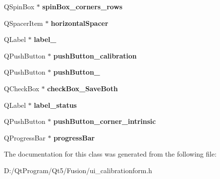 \begin{DoxyCompactItemize}
\item 
\hypertarget{class_ui__calibration_form_a5f1613c55ba70f5d798e6c5b08c89b45}{}Q\+Spin\+Box $\ast$ {\bfseries spin\+Box\+\_\+corners\+\_\+rows}\label{class_ui__calibration_form_a5f1613c55ba70f5d798e6c5b08c89b45}

\item 
\hypertarget{class_ui__calibration_form_a3f2fecb9aaf40cab405f381f3a8ec1de}{}Q\+Spacer\+Item $\ast$ {\bfseries horizontal\+Spacer}\label{class_ui__calibration_form_a3f2fecb9aaf40cab405f381f3a8ec1de}

\item 
\hypertarget{class_ui__calibration_form_a358c84164c30246387591d2c21246bb7}{}Q\+Label $\ast$ {\bfseries label\+\_}\label{class_ui__calibration_form_a358c84164c30246387591d2c21246bb7}

\item 
\hypertarget{class_ui__calibration_form_a78391f3438e253d7700092a530bcf30d}{}Q\+Push\+Button $\ast$ {\bfseries push\+Button\+\_\+calibration}\label{class_ui__calibration_form_a78391f3438e253d7700092a530bcf30d}

\item 
\hypertarget{class_ui__calibration_form_a4925459341f6593e26156ccc401421ad}{}Q\+Push\+Button $\ast$ {\bfseries push\+Button\+\_}\label{class_ui__calibration_form_a4925459341f6593e26156ccc401421ad}

\item 
\hypertarget{class_ui__calibration_form_a8b775bb32c33a7db877b842d302455de}{}Q\+Check\+Box $\ast$ {\bfseries check\+Box\+\_\+\+Save\+Both}\label{class_ui__calibration_form_a8b775bb32c33a7db877b842d302455de}

\item 
\hypertarget{class_ui__calibration_form_a69a40d8f1c5455676702edde2f374163}{}Q\+Label $\ast$ {\bfseries label\+\_\+status}\label{class_ui__calibration_form_a69a40d8f1c5455676702edde2f374163}

\item 
\hypertarget{class_ui__calibration_form_a3b0ea8f3c42bf5f5365aa10e54cbc295}{}Q\+Push\+Button $\ast$ {\bfseries push\+Button\+\_\+corner\+\_\+intrinsic}\label{class_ui__calibration_form_a3b0ea8f3c42bf5f5365aa10e54cbc295}

\item 
\hypertarget{class_ui__calibration_form_ac8f817c5b55ec50f17f9c48d6e8cf2f3}{}Q\+Progress\+Bar $\ast$ {\bfseries progress\+Bar}\label{class_ui__calibration_form_ac8f817c5b55ec50f17f9c48d6e8cf2f3}

\end{DoxyCompactItemize}


The documentation for this class was generated from the following file\+:\begin{DoxyCompactItemize}
\item 
D\+:/\+Qt\+Program/\+Qt5/\+Fusion/ui\+\_\+calibrationform.\+h\end{DoxyCompactItemize}
